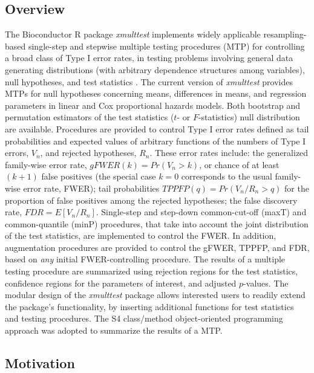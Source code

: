 \documentclass[11pt]{article}
\newcommand{\Rpackage}[1]{\textit{#1}}
\begin{document}
\subsection{Overview}
The Bioconductor R package \Rpackage{xmulttest} implements widely applicable resampling-based single-step and stepwise multiple testing procedures (MTP) for controlling a broad class of Type I error rates, in testing problems involving general data generating distributions (with arbitrary dependence structures among variables), null hypotheses, and test statistics \cite{Dudoit&vdLaanMTBook,DudoitetalMT1SAGMB04,vdLaanetalMT2SAGMB04,vdLaanetalMT3SAGMB04,Pollard&vdLaanJSPI04}. 
The current version of \Rpackage{xmulttest} provides MTPs for null hypotheses concerning means, differences in means, and regression parameters in linear and Cox proportional hazards models.
Both bootstrap and permutation estimators of the test statistics ($t$- or $F$-statistics) null distribution are available. 
Procedures are provided to control Type I error rates defined as tail probabilities and expected values of arbitrary functions of the numbers of Type I errors, $V_n$, and rejected hypotheses, $R_n$. 
These error rates include: 
the generalized family-wise error rate, $gFWER(k) = Pr(V_n > k)$, or chance of at least $(k+1)$ false positives (the special case $k=0$ corresponds to the usual family-wise error rate, FWER); 
tail probabilities $TPPFP(q) = Pr(V_n/R_n > q)$ for the proportion of false positives among the rejected hypotheses;
the false discovery rate, $FDR=E[V_n/R_n]$.
Single-step and step-down common-cut-off (maxT) and common-quantile (minP) procedures, that take into account the joint distribution of the test statistics, are implemented to control the FWER. 
In addition, augmentation procedures are provided to control the gFWER, TPPFP, and FDR, based on {\em any} initial FWER-controlling procedure.
The results of a multiple testing procedure are summarized using rejection regions for the test statistics, confidence regions for the parameters of interest, and adjusted $p$-values.
The modular design of the \Rpackage{xmulttest} package allows interested users to readily extend the package's functionality, by inserting additional functions for test statistics and testing procedures. 
The S4 class/method object-oriented programming approach was adopted to summarize the results of a MTP.

\subsection{Motivation}
\end{document}
